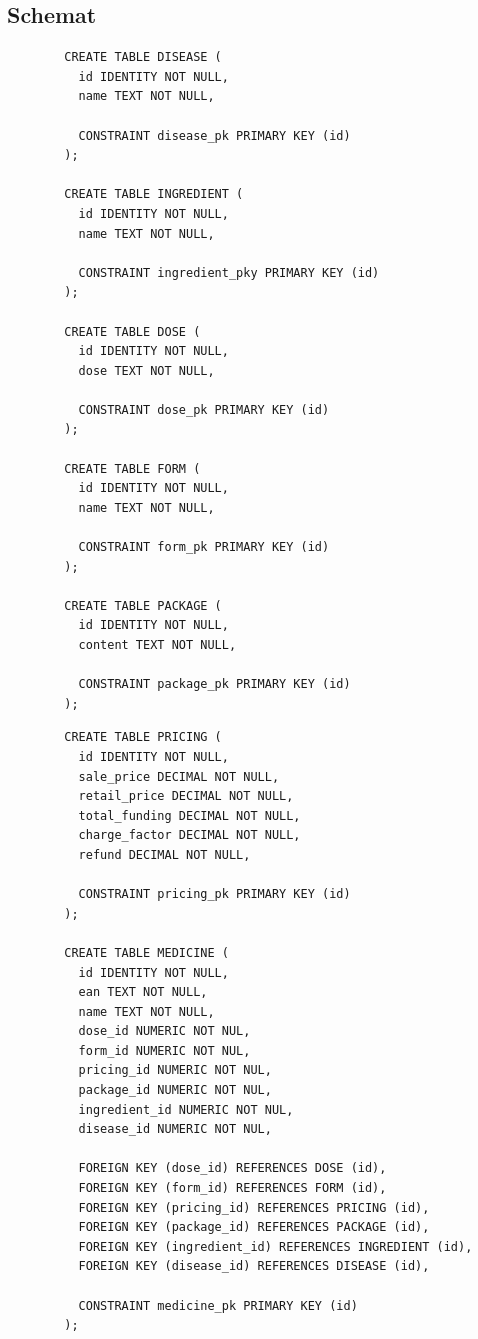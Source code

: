 \documentclass{article}
\begin{document}
  \subsection{Schemat}
    \noindent
    \begin{minipage}{.45\textwidth}
      \begin{lstlisting}
        CREATE TABLE DISEASE (
          id IDENTITY NOT NULL,
          name TEXT NOT NULL,

          CONSTRAINT disease_pk PRIMARY KEY (id)
        );

        CREATE TABLE INGREDIENT (
          id IDENTITY NOT NULL,
          name TEXT NOT NULL,

          CONSTRAINT ingredient_pky PRIMARY KEY (id)
        );

        CREATE TABLE DOSE (
          id IDENTITY NOT NULL,
          dose TEXT NOT NULL,

          CONSTRAINT dose_pk PRIMARY KEY (id)
        );

        CREATE TABLE FORM (
          id IDENTITY NOT NULL,
          name TEXT NOT NULL,

          CONSTRAINT form_pk PRIMARY KEY (id)
        );

        CREATE TABLE PACKAGE (
          id IDENTITY NOT NULL,
          content TEXT NOT NULL,

          CONSTRAINT package_pk PRIMARY KEY (id)
        );
      \end{lstlisting}
    \end{minipage}\hfill
    \begin{minipage}{.45\textwidth}
      \begin{lstlisting}
        CREATE TABLE PRICING (
          id IDENTITY NOT NULL,
          sale_price DECIMAL NOT NULL,
          retail_price DECIMAL NOT NULL,
          total_funding DECIMAL NOT NULL,
          charge_factor DECIMAL NOT NULL,
          refund DECIMAL NOT NULL,

          CONSTRAINT pricing_pk PRIMARY KEY (id)
        );

        CREATE TABLE MEDICINE (
          id IDENTITY NOT NULL,
          ean TEXT NOT NULL,
          name TEXT NOT NULL,
          dose_id NUMERIC NOT NUL,
          form_id NUMERIC NOT NUL,
          pricing_id NUMERIC NOT NUL,
          package_id NUMERIC NOT NUL,
          ingredient_id NUMERIC NOT NUL,
          disease_id NUMERIC NOT NUL,

          FOREIGN KEY (dose_id) REFERENCES DOSE (id),
          FOREIGN KEY (form_id) REFERENCES FORM (id),
          FOREIGN KEY (pricing_id) REFERENCES PRICING (id),
          FOREIGN KEY (package_id) REFERENCES PACKAGE (id),
          FOREIGN KEY (ingredient_id) REFERENCES INGREDIENT (id),
          FOREIGN KEY (disease_id) REFERENCES DISEASE (id),

          CONSTRAINT medicine_pk PRIMARY KEY (id)
        );
      \end{lstlisting}
    \end{minipage}
\end{document}
